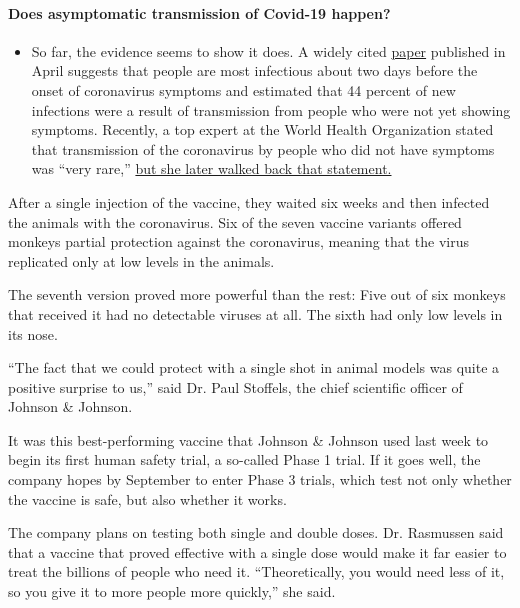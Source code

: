 \begin{itemize}
{  \paragraph{Does asymptomatic transmission of Covid-19
  happen?}\label{does-asymptomatic-transmission-of-covid-19-happen}}

  \begin{itemize}
  \tightlist
  \item
    So far, the evidence seems to show it does. A widely cited
    \href{https://www.nature.com/articles/s41591-020-0869-5}{paper}
    published in April suggests that people are most infectious about
    two days before the onset of coronavirus symptoms and estimated that
    44 percent of new infections were a result of transmission from
    people who were not yet showing symptoms. Recently, a top expert at
    the World Health Organization stated that transmission of the
    coronavirus by people who did not have symptoms was ``very rare,''
    \href{https://www.nytimes.com/2020/06/09/world/coronavirus-updates.html?action=click\&pgtype=Article\&state=default\&region=MAIN_CONTENT_3\&context=storylines_faq\#link-1f302e21}{but
    she later walked back that statement.}
  \end{itemize}
\end{itemize}

After a single injection of the vaccine, they waited six weeks and then
infected the animals with the coronavirus. Six of the seven vaccine
variants offered monkeys partial protection against the coronavirus,
meaning that the virus replicated only at low levels in the animals.

The seventh version proved more powerful than the rest: Five out of six
monkeys that received it had no detectable viruses at all. The sixth had
only low levels in its nose.

``The fact that we could protect with a single shot in animal models was
quite a positive surprise to us,'' said Dr. Paul Stoffels, the chief
scientific officer of Johnson \& Johnson.

It was this best-performing vaccine that Johnson \& Johnson used last
week to begin its first human safety trial, a so-called Phase 1 trial.
If it goes well, the company hopes by September to enter Phase 3 trials,
which test not only whether the vaccine is safe, but also whether it
works.

The company plans on testing both single and double doses. Dr. Rasmussen
said that a vaccine that proved effective with a single dose would make
it far easier to treat the billions of people who need it.
``Theoretically, you would need less of it, so you give it to more
people more quickly,'' she said.

